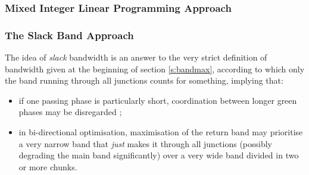 

\subsubsection*{Mixed Integer Linear Programming Approach}

\subsubsection*{The Slack Band Approach}
The idea of \emph{slack} bandwidth is an answer to the very strict definition of bandwidth given at the beginning of section \ref{s:bandmax}, according to which only the band running through all junctions counts for something, implying that:
\begin{itemize}
\item if one passing phase is particularly short, coordination between longer green phases may be disregarded ;
\item in bi-directional optimisation, maximisation of the return band may prioritise a very narrow band that \emph{just} makes it through all junctions (possibly degrading the main band significantly) over a very wide band divided in two or more chunks.
\end{itemize} 
